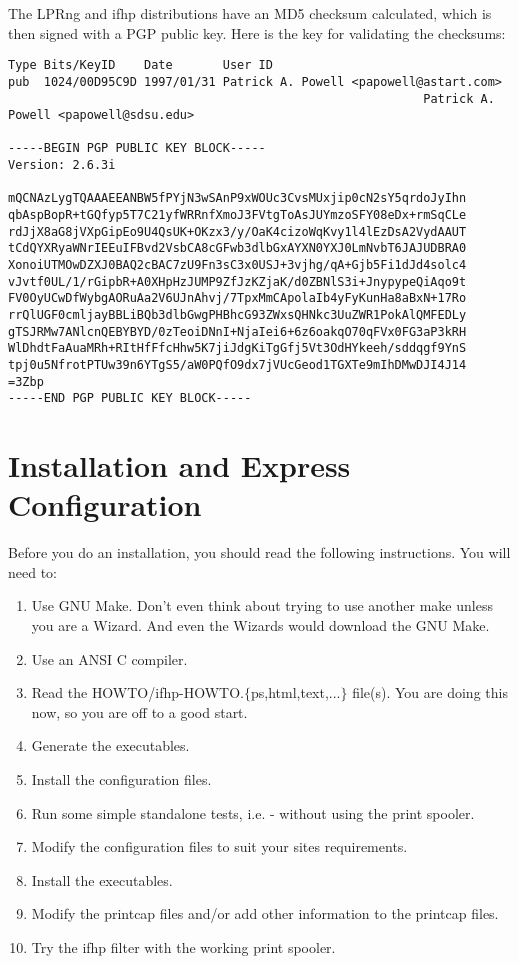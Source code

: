 \documentclass[a4paper]{article}
\begin{document}
The LPRng and {\ttfamily ifhp} distributions have an MD5 checksum calculated,
which is then signed with a PGP public key.
Here is the key for validating the checksums:
\begin{tscreen}
\begin{verbatim}
Type Bits/KeyID    Date       User ID
pub  1024/00D95C9D 1997/01/31 Patrick A. Powell <papowell@astart.com>
                                                          Patrick A. Powell <papowell@sdsu.edu>

-----BEGIN PGP PUBLIC KEY BLOCK-----
Version: 2.6.3i

mQCNAzLygTQAAAEEANBW5fPYjN3wSAnP9xWOUc3CvsMUxjip0cN2sY5qrdoJyIhn
qbAspBopR+tGQfyp5T7C21yfWRRnfXmoJ3FVtgToAsJUYmzoSFY08eDx+rmSqCLe
rdJjX8aG8jVXpGipEo9U4QsUK+OKzx3/y/OaK4cizoWqKvy1l4lEzDsA2VydAAUT
tCdQYXRyaWNrIEEuIFBvd2VsbCA8cGFwb3dlbGxAYXN0YXJ0LmNvbT6JAJUDBRA0
XonoiUTMOwDZXJ0BAQ2cBAC7zU9Fn3sC3x0USJ+3vjhg/qA+Gjb5Fi1dJd4solc4
vJvtf0UL/1/rGipbR+A0XHpHzJUMP9ZfJzKZjaK/d0ZBNlS3i+JnypypeQiAqo9t
FV0OyUCwDfWybgAORuAa2V6UJnAhvj/7TpxMmCApolaIb4yFyKunHa8aBxN+17Ro
rrQlUGF0cmljayBBLiBQb3dlbGwgPHBhcG93ZWxsQHNkc3UuZWR1PokAlQMFEDLy
gTSJRMw7ANlcnQEBYBYD/0zTeoiDNnI+NjaIei6+6z6oakqO70qFVx0FG3aP3kRH
WlDhdtFaAuaMRh+RItHfFfcHhw5K7jiJdgKiTgGfj5Vt3OdHYkeeh/sddqgf9YnS
tpj0u5NfrotPTUw39n6YTgS5/aW0PQfO9dx7jVUcGeod1TGXTe9mIhDMwDJI4J14
=3Zbp
-----END PGP PUBLIC KEY BLOCK-----
\end{verbatim}
\end{tscreen}



\section{Installation and Express Configuration}

Before you do an installation,
you should read the following instructions.
You will need to:
\begin{enumerate}
\item Use GNU Make.  Don't even think about trying to use another
make unless you are a Wizard.  And even the Wizards would
download the GNU Make.
\item Use an ANSI C compiler.
\item Read the {\ttfamily HOWTO/ifhp-HOWTO.$\{$ps,html,text,...$\}$}
file(s).
You are doing this now, so you are off to a good start.
\item Generate the executables.
\item Install the configuration files.
\item Run some simple standalone tests,
i.e. - without using the print spooler.
\item Modify the configuration files to suit your sites requirements.
\item Install the executables.
\item Modify the printcap files and/or add other information to the printcap files.
\item Try the {\ttfamily ifhp} filter with the working print spooler.
\end{enumerate}
\end{document}
